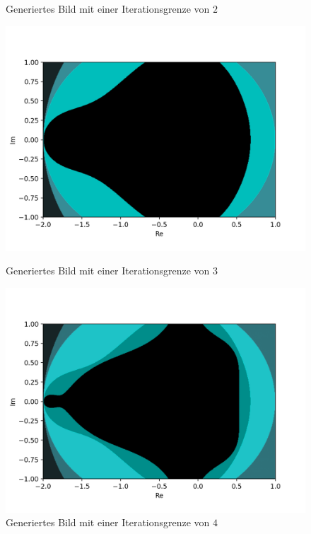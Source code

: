 \begin{figure}[H]
\begin{minipage}[t]{0.48\textwidth}
  \vspace*{-8ex}
  \caption{Generiertes Bild mit einer Iterationsgrenze von $2$}
  \label{app:8.2}
\end{minipage}
\begin{minipage}[t]{0.48\textwidth}
  \centering
  \includegraphics[width=\linewidth]{images/maxBorder/3}
  \vspace*{-8ex}
  \caption{Generiertes Bild mit einer Iterationsgrenze von $3$}
  \label{app:8.3}
\end{minipage}%
\hspace{2ex}
\begin{minipage}[t]{0.48\textwidth}
  \centering
  \includegraphics[width=\linewidth]{images/maxBorder/4}
  \vspace*{-8ex}
  \caption{Generiertes Bild mit einer Iterationsgrenze von $4$}
  \label{app:8.4}
\end{minipage}
\label{fig:mandelbrot-set-max-border-1}
\end{figure}
\newpage

